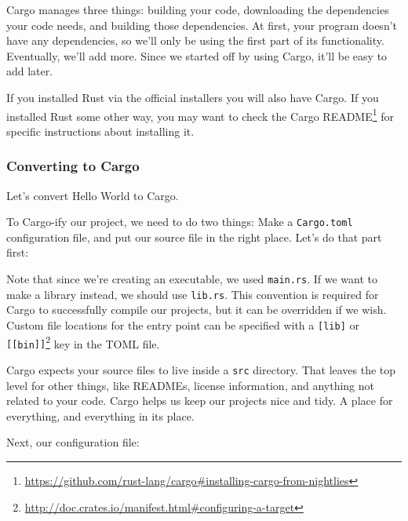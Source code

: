 \documentclass[a4paper,]{book}
\newenvironment{Shaded}{\begin{snugshade}}{\end{snugshade}}
\newcommand{\KeywordTok}[1]{\textcolor[rgb]{0.13,0.29,0.53}{\textbf{{#1}}}}
\newcommand{\NormalTok}[1]{{#1}}
\renewcommand{\href}[2]{#2\footnote{\url{#1}}}
\begin{document}
Cargo manages three things: building your code, downloading the
dependencies your code needs, and building those dependencies. At first,
your program doesn't have any dependencies, so we'll only be using the
first part of its functionality. Eventually, we'll add more. Since we
started off by using Cargo, it'll be easy to add later.

If you installed Rust via the official installers you will also have
Cargo. If you installed Rust some other way, you may want to
\href{https://github.com/rust-lang/cargo\#installing-cargo-from-nightlies}{check
the Cargo README} for specific instructions about installing it.

\subsubsection{Converting to Cargo}\label{converting-to-cargo}

Let's convert Hello World to Cargo.

To Cargo-ify our project, we need to do two things: Make a
\texttt{Cargo.toml} configuration file, and put our source file in the
right place. Let's do that part first:

\begin{Shaded}
\end{Shaded}

Note that since we're creating an executable, we used \texttt{main.rs}.
If we want to make a library instead, we should use \texttt{lib.rs}.
This convention is required for Cargo to successfully compile our
projects, but it can be overridden if we wish. Custom file locations for
the entry point can be specified with a
\href{http://doc.crates.io/manifest.html\#configuring-a-target}{\texttt{{[}lib{]}}
or \texttt{{[}{[}bin{]}{]}}} key in the TOML file.

Cargo expects your source files to live inside a \texttt{src} directory.
That leaves the top level for other things, like READMEs, license
information, and anything not related to your code. Cargo helps us keep
our projects nice and tidy. A place for everything, and everything in
its place.

Next, our configuration file:

\begin{Shaded}
\end{Shaded}
\end{document}

